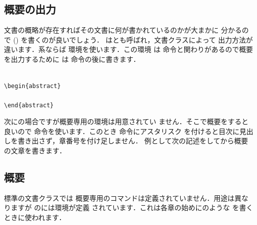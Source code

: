 \section{概要の出力}
文書の概略が存在すればその文書に何が書かれているのかが大まかに
分かるので () を書くのが良いでしょう．
はとも呼ばれ，文書クラスによって
出力方法が違います．系ならば
環境を使います．この環境
は  命令と関わりがあるので概要を出力するために
は  命令の後に書きます．
\begin{Syntax}
\\
\verb|\begin{abstract}|\\
\\
\verb|\end{abstract}|
\end{Syntax}
次にの場合ですが概要専用の環境は用意されてい
ません．そこで概要をすると良いので  
命令を使います．このとき 命令にアスタリスク 
\qu{\texttt*}を付けると目次に見出しを書き出さず，章番号を付け足しません．
例として次の記述をしてから概要の文章を書きます．

\begin{InTeX}
\chapter*{概要}
\end{InTeX}

標準の文書クラスでは
概要専用のコマンドは定義されていません．用途は異なりますが
のには環境が定義
されています．これは各章の始めにのような
を書くときに使われます．

% 

